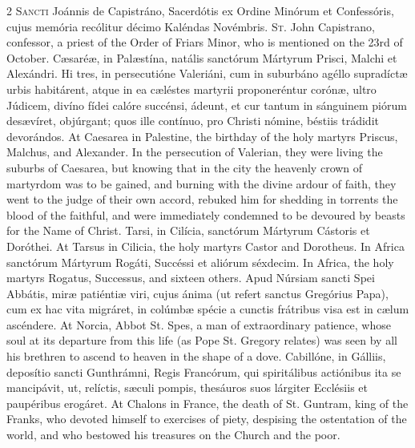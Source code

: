 \begin{paracol}{2}
\lettrine[lines=2]{S}{ancti} Joánnis de Capistráno, Sacerdótis ex Ordine Minórum et Confessóris, 
 cujus memória recólitur décimo Kaléndas Novémbris.
\switchcolumn
{}
\lettrine[lines=2]{S}{t.} John Capistrano, confessor, a priest of the Order of Friars Minor, who 
 is mentioned on the 23rd of October.
\switchcolumn*
{}
Cæsaréæ, in Palæstína, natális sanctórum 
 Mártyrum Prisci, Malchi et Alexándri. Hi tres, in persecutióne 
 Valeriáni, cum in suburbáno agéllo supradíctæ urbis habitárent, atque in ea 
 cæléstes martyrii proponeréntur corónæ, ultro Júdicem, divíno fídei calóre 
 succénsi, ádeunt, et cur tantum in sánguinem piórum desævíret, objúrgant; 
 quos ille contínuo, pro Christi nómine, béstiis trádidit devorándos.
\switchcolumn
{}
At Caesarea in Palestine, the birthday of the holy martyrs Priscus, Malchus, 
 and Alexander. In the persecution of Valerian, they were living the 
 suburbs of Caesarea, but knowing that in the city the heavenly crown of 
 martyrdom was to be gained, and burning with the divine ardour of faith, 
 they went to the judge of their own accord, rebuked him for shedding in 
 torrents the blood of the faithful, and were immediately condemned to be 
 devoured by beasts for the Name of Christ.
\switchcolumn*
{}
Tarsi, in Cilícia, sanctórum Mártyrum Cástoris 
 et Doróthei.
\switchcolumn
{}
At Tarsus in Cilicia, the holy martyrs Castor and Dorotheus.
\switchcolumn*
{}
In Africa sanctórum Mártyrum Rogáti, 
 Succéssi et aliórum séxdecim.
\switchcolumn
{}
In Africa, the holy martyrs Rogatus, Successus, and sixteen others.
\switchcolumn*
{}
Apud Núrsiam sancti Spei Abbátis, miræ 
 patiéntiæ viri, cujus ánima (ut refert sanctus Gregórius Papa), cum ex hac 
 vita migráret, in colúmbæ spécie a cunctis frátribus visa est in cælum 
 ascéndere.
\switchcolumn
{}
At Norcia, Abbot St. Spes, a man of extraordinary patience, whose soul at 
 its departure from this life (as Pope St. Gregory relates) was seen by all 
 his brethren to ascend to heaven in the shape of a dove.
\switchcolumn*
{}
Cabillóne, in Gálliis, deposítio sancti Gunthrámni, Regis Francórum, qui 
 spiritálibus actiónibus ita se mancipávit, ut, relíctis, sæculi 
 pompis, thesáuros suos lárgiter Ecclésiis et paupéribus erogáret.
\switchcolumn
{}
At Chalons in France, the death of St. Guntram, king of the Franks, who 
 devoted himself to exercises of piety, despising the ostentation of the 
 world, and who bestowed his treasures on the Church and the poor.
\switchcolumn*
{}
\end{paracol}


